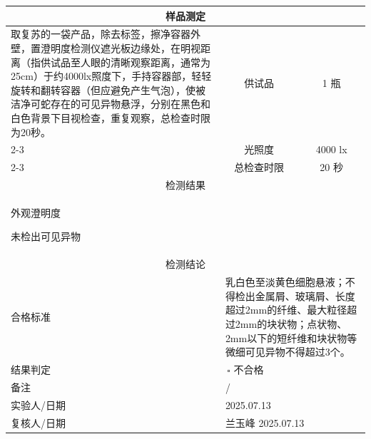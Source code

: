 \documentclass[UTF8,10pt,a4paper,fontset=fandol]{ctexart}
\newcommand{\fieldvalue}[1]{#1}
\newcommand{\handwritten}[1]{#1}
\begin{document}
\begin{tabularx}    {\textwidth}{|X|c|c|}
\hline
\multicolumn{3}{|c|}{样品测定}\\
\hline
取复苏的一袋产品，除去标签，擦净容器外壁，置澄明度检测仪遮光板边缘处，在明视距离（指供试品至人眼的清晰观察距离，通常为25cm）于约4000lx照度下，手持容器部，轻轻旋转和翻转容器（但应避免产生气泡），使被洁净可蛇存在的可见异物悬浮，分别在黑色和白色背景下目视检查，重复观察，总检查时限为20秒。 &
供试品 &
\fieldvalue{\handwritten{1}} 瓶\\
\cline{2-3}
& 光照度 &
\fieldvalue{\handwritten{4000}} lx\\
\cline{2-3}
& 总检查时限 &
\fieldvalue{\handwritten{20}} 秒\\
\hline
\multicolumn{3}{|c|}{检测结果}\\
\hline
\multicolumn{3}{|p{0.95\textwidth}|}{
\handwritten{外观澄明度}

\handwritten{未检出可见异物}
}\\
\hline
\multicolumn{3}{|c|}{检测结论}\\
\hline
合格标准 &
\multicolumn{2}{l|}{乳白色至淡黄色细胞悬液；不得检出金属屑、玻璃屑、长度超过2mm的纤维、最大粒径超过2mm的块状物；点状物、2mm以下的短纤维和块状物等微细可见异物不得超过3个。}\\
\hline
结果判定 &
\multicolumn{2}{l|}{
\fieldvalue{\handwritten{\checkmark}\,\text{合格}}\qquad $\square$ 不合格}\\
\hline
备注 &
\multicolumn{2}{l|}{
\fieldvalue{\handwritten{/}}}\\
\hline
实验人/日期 &
\multicolumn{2}{l|}{
\fieldvalue{\handwritten{2025.07.13}}}\\
\hline
复核人/日期 &
\multicolumn{2}{l|}{
\fieldvalue{\handwritten{兰玉峰}}\quad
\fieldvalue{\handwritten{2025.07.13}}}\\
\hline
\end{tabularx}
\end{document}
